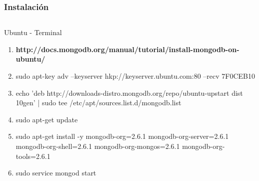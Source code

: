 \documentclass{beamer}
\begin{document}
\begin{frame}
\frametitle{Instalaci\'on}
\begin{columns}[c] %

\begin{block}{Ubuntu - Terminal}
\begin{enumerate}
\item \textbf{http://docs.mongodb.org/manual/tutorial/install-mongodb-on-ubuntu/}
\item sudo apt-key adv --keyserver hkp://keyserver.ubuntu.com:80 --recv 7F0CEB10
\item echo 'deb http://downloads-distro.mongodb.org/repo/ubuntu-upstart dist 10gen' | sudo tee /etc/apt/sources.list.d/mongodb.list
\item sudo apt-get update
\item sudo apt-get install -y mongodb-org=2.6.1 mongodb-org-server=2.6.1 mongodb-org-shell=2.6.1 mongodb-org-mongos=2.6.1 mongodb-org-tools=2.6.1
\item sudo service mongod start
\end{enumerate}
\end{block}


\end{columns}
\end{frame}

\end{document}
